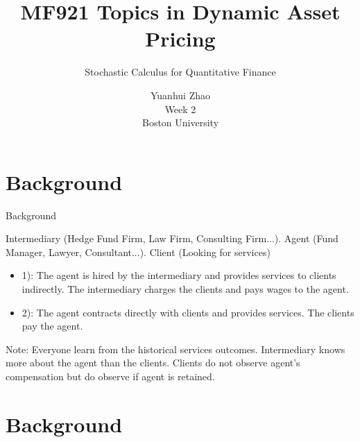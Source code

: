 \documentclass{beamer}
\title{MF921 Topics in Dynamic Asset Pricing}
\author{Stochastic Calculus for Quantitative Finance}
\date{Yuanhui Zhao\\Week 2\\Boston University}
\begin{document}
\frame{\titlepage}
\section{Background}
\begin{frame}{Background}
\par Intermediary (Hedge Fund Firm, Law Firm, Consulting Firm...). Agent (Fund Manager, Lawyer, Consultant...). Client (Looking for services)
\vspace{2em}
\begin{itemize}
    \item 1): The agent is hired by the intermediary and provides services to clients indirectly. The intermediary charges the clients and pays wages to the agent.
    \vspace{1em}
    \item 2): The agent contracts directly with clients and provides services. The clients pay the agent.
\end{itemize}
\vspace{1em}
\par Note: Everyone learn from the historical services outcomes. Intermediary knows more about the agent than the clients. Clients do not observe agent's compensation but do observe if agent is retained.
\end{frame}
\section{Background}
\end{document}
